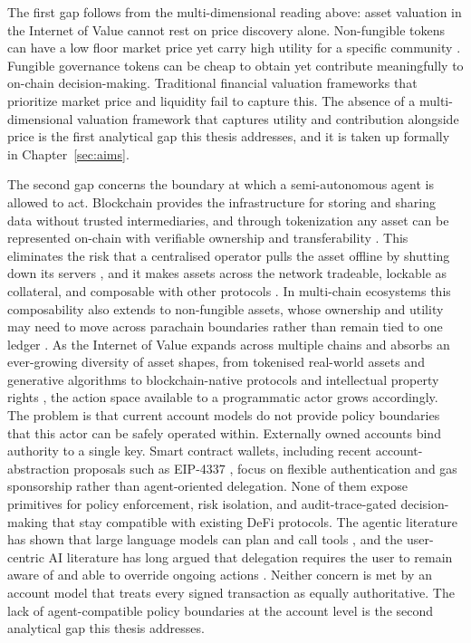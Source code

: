 The first gap follows from the multi-dimensional reading above: asset valuation in the Internet of Value cannot rest on price discovery alone. Non-fungible tokens can have a low floor market price yet carry high utility for a specific community \cite{Ante2021, Dowling2022, Nadini2021, Kong2021}. Fungible governance tokens can be cheap to obtain yet contribute meaningfully to on-chain decision-making. Traditional financial valuation frameworks that prioritize market price and liquidity fail to capture this. The absence of a multi-dimensional valuation framework that captures utility and contribution alongside price is the first analytical gap this thesis addresses, and it is taken up formally in Chapter~\ref{sec:aims}.

The second gap concerns the boundary at which a semi-autonomous agent is allowed to act. Blockchain provides the infrastructure for storing and sharing data without trusted intermediaries, and through tokenization any asset can be represented on-chain with verifiable ownership and transferability \cite{Jeon2022}. This eliminates the risk that a centralised operator pulls the asset offline by shutting down its servers \cite{Duan2021}, and it makes assets across the network tradeable, lockable as collateral, and composable with other protocols \cite{Williams2019, Gudgeon2020}. In multi-chain ecosystems this composability also extends to non-fungible assets, whose ownership and utility may need to move across parachain boundaries rather than remain tied to one ledger \cite{Morhac2024nftsharing}. As the Internet of Value expands across multiple chains and absorbs an ever-growing diversity of asset shapes, from tokenised real-world assets and generative algorithms to blockchain-native protocols and intellectual property rights \cite{Bambridge2022}, the action space available to a programmatic actor grows accordingly. The problem is that current account models do not provide policy boundaries that this actor can be safely operated within. Externally owned accounts bind authority to a single key. Smart contract wallets, including recent account-abstraction proposals such as EIP-4337 \cite{Buterin2021, Wang2023, Duan2024}, focus on flexible authentication and gas sponsorship rather than agent-oriented delegation. None of them expose primitives for policy enforcement, risk isolation, and audit-trace-gated decision-making that stay compatible with existing DeFi protocols. The agentic literature has shown that large language models can plan and call tools \cite{Sumers2024, Wu2023, Wang2024survey}, and the user-centric AI literature has long argued that delegation requires the user to remain aware of and able to override ongoing actions \cite{Amershi2019, Shneiderman2022, Wang2021}. Neither concern is met by an account model that treats every signed transaction as equally authoritative. The lack of agent-compatible policy boundaries at the account level is the second analytical gap this thesis addresses.

